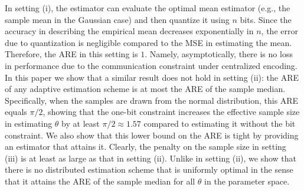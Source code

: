 \documentclass[letterpaper, 11pt]{IEEEtran}      %
\begin{document}
In setting (i), the estimator can evaluate the optimal mean estimator (e.g., the sample mean in the Gaussian case) and then quantize it using $n$ bits. Since the accuracy in describing the empirical mean decreases exponentially in $n$, the error due to quantization is negligible compared to the MSE in estimating the mean. Therefore, the ARE in this setting is $1$. Namely, asymptotically, there is no loss in performance due to the communication constraint under centralized encoding. 
%
In this paper we show that a similar result does not hold in setting (ii): the ARE of any adaptive estimation scheme is at most the ARE of the sample median. Specifically, when the samples are drawn from the normal distribution, this ARE equals $\pi/2$, showing that the one-bit constraint increases the effective sample size in estimating $\theta$ by at least $\pi/2 \approx 1.57$ compared to estimating it without the bit constraint. We also show that this lower bound on the ARE is tight by providing an estimator that attains it. %
%
Clearly, the penalty on the sample size in setting (iii) is at least as large as that in setting (ii). 
Unlike in setting (ii), we show that there is no distributed estimation scheme that is uniformly optimal in the sense that it attains the ARE of the sample median for all $\theta$ in the parameter space. 
\end{document}
